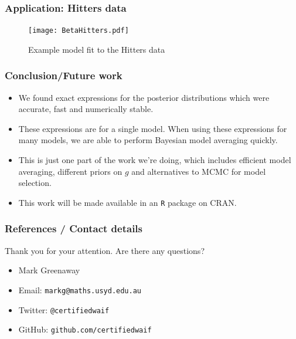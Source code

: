 \documentclass{beamer}
\begin{document}
\begin{frame}
	\frametitle{Application: Hitters data}
	\begin{figure}
		\caption{Example model fit to the Hitters data}
		\texttt{[image: BetaHitters.pdf]}
	\end{figure}
\end{frame}


\begin{frame}
	\frametitle{Conclusion/Future work}
	\begin{itemize}
		\item We found exact expressions for the posterior distributions which were accurate, fast and numerically
					stable.
		\item These expressions are for a single model. When using these expressions for many models, we are able
					to perform Bayesian model averaging quickly.
		\item This is just one part of the work we're doing, which includes efficient model averaging, different
					priors on $g$ and alternatives to MCMC for model selection.
		\item This work will be made available in an \texttt{R} package on CRAN.
	\end{itemize}
\end{frame}

\begin{frame}
	\frametitle{References / Contact details}
	Thank you for your attention. Are there any questions?
	\begin{itemize}
		\item Mark Greenaway
		\item Email: \texttt{markg@maths.usyd.edu.au}
		\item Twitter: \texttt{@certifiedwaif}
		\item GitHub: \texttt{github.com/certifiedwaif}
	\end{itemize}

	\small
	
	
\end{frame}

\end{document}
